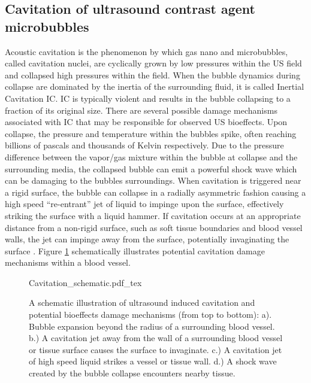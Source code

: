 \subsection{Cavitation of ultrasound contrast agent
  microbubbles} \label{subsec:bioeffects_mechanisms_ceus}%
Acoustic cavitation is the phenomenon by which gas nano and
microbubbles, called cavitation nuclei, are cyclically grown by low
pressures within the \ac{US} field and collapsed high pressures within
the field. When the bubble dynamics during collapse are dominated by
the inertia of the surrounding fluid, it is called Inertial Cavitation
\ac{IC}. \ac{IC} is typically violent and results in the bubble
collapsing to a fraction of its original size. There are several
possible damage mechanisms associated with \ac{IC} that may be
responsible for observed \ac{US} bioeffects. Upon collapse, the
pressure and temperature within the bubbles spike, often reaching
billions of pascals and thousands of Kelvin respectively. Due to the
pressure difference between the vapor/gas mixture within the bubble at
collapse and the surrounding media, the collapsed bubble can emit a
powerful shock wave which can be damaging to the bubbles
surroundings. When cavitation is triggered near a rigid surface, the
bubble can collapse in a radially asymmetric fashion causing a high
speed ``re-entrant'' jet of liquid to impinge upon the surface,
effectively striking the surface with a liquid hammer. If cavitation
occurs at an appropriate distance from a non-rigid surface, such as
soft tissue boundaries and blood vessel walls, the jet can impinge
away from the surface, potentially invaginating the surface
\citep{Brujan2011}. Figure \ref{fig:intro_cavitation_schematic}
schematically illustrates potential cavitation damage mechanisms
within a blood vessel.
\begin{figure}
  \centering
  \def\svgwidth{0.9\textwidth}
  {Cavitation_schematic.pdf_tex} \hfill%
    \caption{A schematic illustration of ultrasound induced cavitation
    and potential bioeffects damage mechanisms (from top to bottom):
    a). Bubble expansion beyond the radius of a surrounding blood
    vessel. b.) A cavitation jet away from the wall of a surrounding
    blood vessel or tissue surface causes the surface to
    invaginate. c.) A cavitation jet of high speed liquid strikes a
    vessel or tissue wall. d.) A shock wave created by the bubble
    collapse encounters nearby tissue.}
  \label{fig:intro_cavitation_schematic}
\end{figure}

